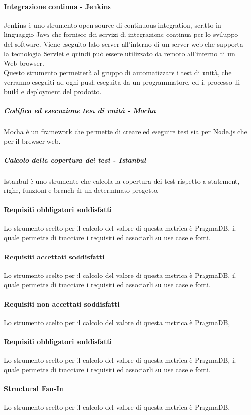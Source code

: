 \paragraph{Integrazione continua - Jenkins}
Jenkins è uno strumento open source di continuous integration, scritto in linguaggio Java che fornisce dei servizi di integrazione continua per lo sviluppo del software. Viene eseguito lato server all'interno di un server web che supporta la tecnologia Servlet e quindi può essere utilizzato da remoto all'interno di un Web browser.\\
Questo strumento permetterà al gruppo di automatizzare i test di unità, che verranno eseguiti ad ogni push eseguita da un programmatore, ed il processo di build e deployment del prodotto.
\subparagraph{Codifica ed esecuzione test di unità - Mocha}
Mocha è un framework che permette di creare ed eseguire test sia per Node.js che per il browser web.
\subparagraph{Calcolo della copertura dei test - Istanbul}
Istanbul è uno strumento che calcola la copertura dei test rispetto a statement, righe, funzioni e branch di un determinato progetto.


\paragraph{Requisiti obbligatori soddisfatti}
Lo strumento scelto per il calcolo del valore di questa metrica è PragmaDB, il quale permette di tracciare i requisiti ed associarli su use case e fonti.
\paragraph{Requisiti accettati soddisfatti}
Lo strumento scelto per il calcolo del valore di questa metrica è PragmaDB, il quale permette di tracciare i requisiti ed associarli su use case e fonti.
\paragraph{Requisiti non accettati soddisfatti}
Lo strumento scelto per il calcolo del valore di questa metrica è PragmaDB,
\paragraph{Requisiti obbligatori soddisfatti}
Lo strumento scelto per il calcolo del valore di questa metrica è PragmaDB, il quale permette di tracciare i requisiti ed associarli su use case e fonti.
\paragraph{Structural Fan-In}
Lo strumento scelto per il calcolo del valore di questa metrica è PragmaDB,
